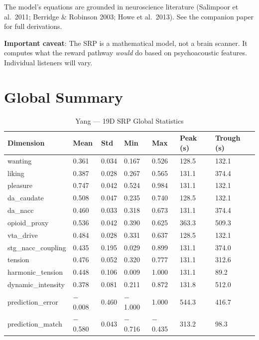 \documentclass[11pt]{article}
\begin{document}
The model's equations are grounded in neuroscience literature (Salimpoor et al.\ 2011; Berridge \& Robinson 2003; Howe et al.\ 2013). See the companion paper for full derivations.

\textbf{Important caveat}: The SRP is a mathematical model, not a brain scanner. It computes what the reward pathway \emph{would} do based on psychoacoustic features. Individual listeners will vary.

\section{Global Summary}

\begin{table}[H]
\centering
\caption{Yang --- 19D SRP Global Statistics}
\label{tab:global}
\small
\begin{tabular}{l R{1.3cm} R{1.3cm} R{1.3cm} R{1.3cm} R{1.8cm} R{1.8cm}}
\toprule
\textbf{Dimension} & \textbf{Mean} & \textbf{Std} & \textbf{Min} & \textbf{Max} & \textbf{Peak (s)} & \textbf{Trough (s)} \\
\midrule
{} wanting & 0.361 & 0.034 & 0.167 & 0.526 & 128.5 & 132.1 \\
 liking & 0.387 & 0.028 & 0.267 & 0.565 & 131.1 & 374.4 \\
 pleasure & 0.747 & 0.042 & 0.524 & 0.984 & 131.1 & 132.1 \\
\midrule
{} da\_caudate & 0.508 & 0.047 & 0.235 & 0.740 & 128.5 & 132.1 \\
 da\_nacc & 0.460 & 0.033 & 0.318 & 0.673 & 131.1 & 374.4 \\
opioid\_proxy & 0.536 & 0.042 & 0.390 & 0.625 & 363.3 & 509.3 \\
vta\_drive & 0.484 & 0.028 & 0.331 & 0.637 & 128.5 & 132.1 \\
stg\_nacc\_coupling & 0.435 & 0.195 & 0.029 & 0.899 & 131.1 & 374.0 \\
\midrule
{} tension & 0.476 & 0.052 & 0.320 & 0.777 & 131.1 & 312.6 \\
harmonic\_tension & 0.448 & 0.106 & 0.009 & 1.000 & 131.1 & 89.2 \\
dynamic\_intensity & 0.378 & 0.081 & 0.211 & 0.872 & 131.8 & 512.0 \\
\midrule
prediction\_error & $-$0.008 & 0.460 & $-$1.000 & 1.000 & 544.3 & 416.7 \\
prediction\_match & $-$0.580 & 0.043 & $-$0.716 & $-$0.435 & 313.2 & 98.3 \\

\end{tabular}
\end{table}
\end{document}
